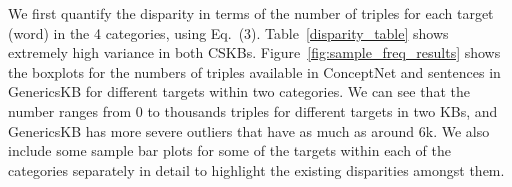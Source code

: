 

We first quantify the disparity in terms of the number of triples for each target (word) in the 4 categories, using Eq.~(3). Table~\ref{disparity_table} shows extremely high variance in both CSKBs. Figure~\ref{fig:sample_freq_results} shows the boxplots for the numbers of triples available in ConceptNet and sentences in GenericsKB for different targets within two categories. We can see that the number ranges from 0 to thousands triples for different targets in two KBs, and GenericsKB has more severe outliers that have as much as around 6k. 
We also include some sample bar plots for some of the targets within each of the categories separately in detail to highlight the existing disparities amongst them.

